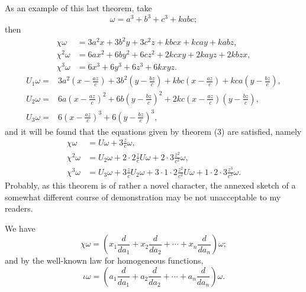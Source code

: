 \documentclass[11pt]{article}
\begin{document}
{{As an example of this last theorem, take
\[
 \omega=a^3+b^3+c^3+kabc;
\]
then
\[
\begin{aligned}
\chi\omega&=3a^2x+3b^2y+3c^2z+kbcx+kcay+kabz,\\
\chi^2\omega&=6ax^2+6by^2+6cz^2+2kcxy+2kayz+2kbzx,\\
\chi^3\omega&=6x^3+6y^3+6z^3+6kxyz.
\end{aligned}
\]
\[
\begin{aligned}
U_1\omega={}&3a^2\left(x-\frac{az}{c}\right)+3b^2\left(y-\frac{bz}{c}\right)
+kbc\left(x-\frac{az}{c}\right)+kca\left(y-\frac{bz}{c}\right),\\
U_2\omega={}&6a\left(x-\frac{az}{c}\right)^2+6b\left(y-\frac{bz}{c}\right)^2
+2kc\left(x-\frac{az}{c}\right)\left(y-\frac{bz}{c}\right),\\
U_3\omega={}&6\left(x-\frac{az}{c}\right)^3+6\left(y-\frac{bz}{c}\right)^3,
\end{aligned}
\]
and it will be found that the equations given by theorem (3) are satisfied, namely
\[
\begin{aligned}
\chi\omega&=U\omega+3\frac{z}{c}\omega,\\
\chi^2\omega&=U_2\omega+2\cdot2\frac{z}{c}U\omega+2\cdot3\frac{z^2}{c^2}\omega,\\
\chi^3\omega&=U_3\omega+3\frac{z}{c}U_2\omega+3\cdot1\cdot2\frac{z^2}{c^2}U\omega+1\cdot2\cdot3\frac{z^3}{c^3}\omega.
\end{aligned}
\]
Probably, as this theorem is of rather a novel character, the annexed sketch of a somewhat different course of demonstration may be not unacceptable to my readers.

We have
\[
 \chi\omega=\left(x_1\frac{d}{da_1}+x_2\frac{d}{da_2}+\cdots+x_n\frac{d}{da_n}\right)\omega;
\]
and by the well-known law for homogeneous functions,
\[
 \iota\omega=\left(a_1\frac{d}{da_1}+a_2\frac{d}{da_2}+\cdots+a_n\frac{d}{da_n}\right)\omega.
\]

}}
\end{document}
